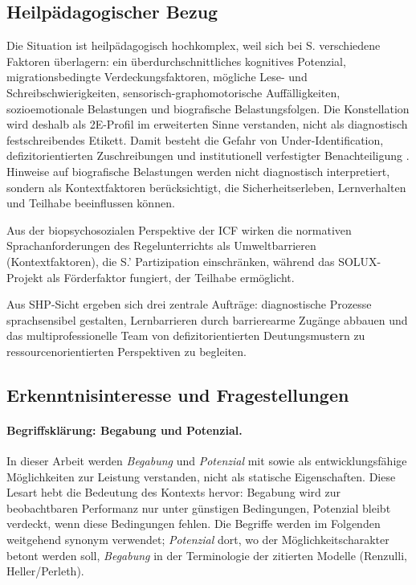 \documentclass[ngerman, a4paper]{article}
\begin{document}
\subsection*{Heilpädagogischer Bezug}

Die Situation ist heilpädagogisch hochkomplex, weil sich bei S. verschiedene
Faktoren überlagern: ein überdurchschnittliches kognitives Potenzial,
migrationsbedingte Verdeckungsfaktoren, mögliche Lese- und Schreibschwierigkeiten,
sensorisch-graphomotorische Auffälligkeiten, sozioemotionale Belastungen und
biografische Belastungsfolgen. Die Konstellation wird deshalb als 2E-Profil im
erweiterten Sinne verstanden, nicht als diagnostisch festschreibendes Etikett.
Damit besteht die Gefahr von Under-Identification, defizitorientierten
Zuschreibungen und institutionell verfestigter Benachteiligung
\parencite[S.\,63--77]{kappus2010migration}. Hinweise auf biografische
Belastungen werden nicht diagnostisch interpretiert, sondern als Kontextfaktoren
berücksichtigt, die Sicherheitserleben, Lernverhalten und Teilhabe beeinflussen
können.

Aus der biopsychosozialen Perspektive der ICF wirken die normativen
Sprachanforderungen des Regelunterrichts als Umweltbarrieren (Kontextfaktoren),
die S.' Partizipation einschränken, während das SOLUX-Projekt als Förderfaktor
fungiert, der Teilhabe ermöglicht.

Aus SHP-Sicht ergeben sich drei zentrale Aufträge: diagnostische Prozesse sprachsensibel
gestalten, Lernbarrieren durch barrierearme Zugänge abbauen und das multiprofessionelle
Team von defizitorientierten Deutungsmustern zu ressourcenorientierten Perspektiven zu begleiten.

\subsection*{Erkenntnisinteresse und Fragestellungen}

\paragraph{Begriffsklärung: Begabung und Potenzial.}
In dieser Arbeit werden \textit{Begabung} und \textit{Potenzial} mit
\textcite{stern2025intelligenz} sowie \textcite[S.\,218]{muelleroppliger2021begabungsmodelle}
als entwicklungsfähige Möglichkeiten zur Leistung verstanden, nicht als
statische Eigenschaften. Diese Lesart hebt die Bedeutung des Kontexts hervor:
Begabung wird zur beobachtbaren Performanz nur unter günstigen Bedingungen,
Potenzial bleibt verdeckt, wenn diese Bedingungen fehlen. Die Begriffe werden
im Folgenden weitgehend synonym verwendet; \textit{Potenzial} dort, wo der
Möglichkeitscharakter betont werden soll, \textit{Begabung} in der Terminologie
der zitierten Modelle (Renzulli, Heller/Perleth).
\end{document}
